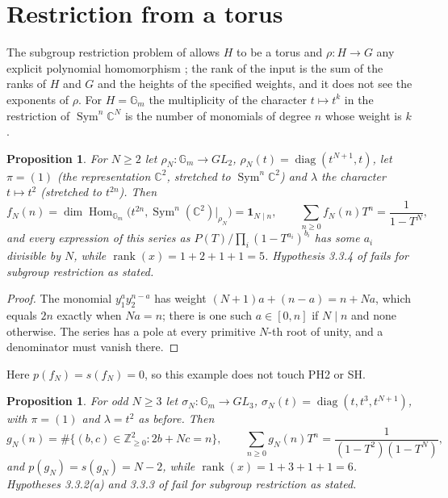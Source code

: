 \documentclass[11pt,a4paper]{article}
\newtheorem{proposition}[theorem]{Proposition}
\theoremstyle{definition}
\newcommand{\C}{\mathbb{C}}
\newcommand{\Z}{\mathbb{Z}}
\newcommand{\Gm}{\mathbb{G}_m}
\newcommand{\Sym}{\operatorname{Sym}}
\newcommand{\Hom}{\operatorname{Hom}}
\newcommand{\diag}{\operatorname{diag}}
\newcommand{\rank}{\operatorname{rank}}
\begin{document}
\section{Restriction from a torus}\label{sec:torus}

The subgroup restriction problem of \cite[Section 3.4]{GCT6} allows $H$ to be a
torus and $\rho:H\to G$ any explicit polynomial homomorphism
\cite[Section 3.4.1]{GCT6}; the rank of the input is the sum of the ranks of
$H$ and $G$ and the heights of the specified weights, and it does not see the
exponents of $\rho$. For $H=\Gm$ the multiplicity of the character $t\mapsto
t^{k}$ in the restriction of $\Sym^n\C^N$ is the number of monomials of degree
$n$ whose weight is $k$.

\begin{proposition}\label{prop:torusmodular}
For $N\ge2$ let $\rho_N:\Gm\to GL_2$, $\rho_N(t)=\diag(t^{N+1},t)$, let $\pi=(1)$
(the representation $\C^2$, stretched to $\Sym^n\C^2$) and $\lambda$ the
character $t\mapsto t^2$ (stretched to $t^{2n}$). Then
\[
 f_N(n)=\dim\Hom_{\Gm}\bigl(t^{2n},\Sym^n(\C^2)|_{\rho_N}\bigr)=\mathbf1_{N\mid n},
 \qquad \sum_{n\ge0}f_N(n)T^n=\frac1{1-T^N},
\]
and every expression of this series as $P(T)/\prod_i(1-T^{a_i})^{b_i}$ has some
$a_i$ divisible by $N$, while $\rank(x)=1+2+1+1=5$. Hypothesis 3.3.4 of
\cite{GCT6} fails for subgroup restriction as stated.
\end{proposition}

\begin{proof}
The monomial $y_1^ay_2^{n-a}$ has weight $(N+1)a+(n-a)=n+Na$, which equals
$2n$ exactly when $Na=n$; there is one such $a\in[0,n]$ if $N\mid n$ and none
otherwise. The series has a pole at every primitive $N$-th root of unity, and a
denominator must vanish there.
\end{proof}

Here $p(f_N)=s(f_N)=0$, so this example does not touch PH2 or SH.

\begin{proposition}\label{prop:torusindices}
For odd $N\ge3$ let $\sigma_N:\Gm\to GL_3$, $\sigma_N(t)=\diag(t,t^3,t^{N+1})$,
with $\pi=(1)$ and $\lambda=t^2$ as before. Then
\[
 g_N(n)=\#\{(b,c)\in\Z_{\ge0}^2:2b+Nc=n\},\qquad
 \sum_{n\ge0}g_N(n)T^n=\frac1{(1-T^2)(1-T^N)},
\]
and $p(g_N)=s(g_N)=N-2$, while $\rank(x)=1+3+1+1=6$. Hypotheses 3.3.2(a) and
3.3.3 of \cite{GCT6} fail for subgroup restriction as stated.
\end{proposition}
\end{document}
